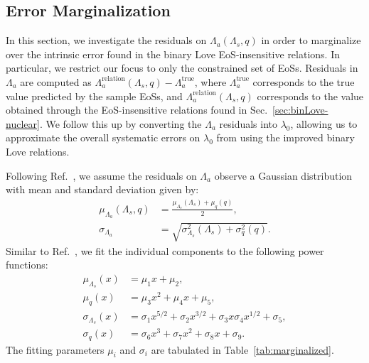 \documentclass[prd,twocolumn,nofootinbib,superscriptaddress,amsmath,amssymb]{revtex4-1}
\begin{document}
\subsection{Error Marginalization}\label{sec:marginalization}

In this section, we investigate the residuals on $\Lambda_a(\Lambda_s,q)$ in order to marginalize over the intrinsic error found in the binary Love EoS-insensitive relations.
In particular, we restrict our focus to only the constrained set of EoSs.
Residuals in $\Lambda_a$ are computed as $\Lambda_a^{\text{relation}}(\Lambda_s,q)-\Lambda_a^{\text{true}}$, where $\Lambda_a^{\text{true}}$ corresponds to the true value predicted by the sample EoSs, and $\Lambda_a^{\text{relation}}(\Lambda_s,q)$ corresponds to the value obtained through the EoS-insensitive relations found in Sec.~\ref{sec:binLove-nuclear}.
We follow this up by converting the $\Lambda_a$ residuals into $\lambda_0$, allowing us to approximate the overall systematic errors on $\lambda_0$ from using the improved binary Love relations.

Following Ref.~\cite{Katerina:residuals}, we assume the residuals on $\Lambda_a$ observe a Gaussian distribution with mean and standard deviation given by:
\begin{align}
\mu_{\Lambda_a}(\Lambda_s,q) &=\frac{\mu_{\Lambda_s}(\Lambda_s)+\mu_{q}(q)}{2},\\ 
\sigma_{\Lambda_a} &=\sqrt{\sigma_{\Lambda_s}^2(\Lambda_s) + \sigma_{q}^2(q)}. 
\end{align}
Similar to Ref.~\cite{Katerina:residuals}, we fit the individual components to the following power functions:
\begin{align}
\mu_{\Lambda_s}(x) &= \mu_1 x + \mu_2, \label{eq:margFit1}\\ 
\mu_{q}(x) &= \mu_3 x^2 + \mu_4 x + \mu_5, \label{eq:margFit2}\\ 
\sigma_{\Lambda_s}(x) &= \sigma_1 x^{5/2} + \sigma_2 x^{3/2} + \sigma_3 x \sigma_4 x^{1/2} + \sigma_5, \label{eq:margFit3}\\ 
\sigma_{q}(x) &= \sigma_6 x^3 + \sigma_7 x^2 + \sigma_8 x + \sigma_9. \label{eq:margFit4}
\end{align}
The fitting parameters $\mu_i$ and $\sigma_i$ are tabulated in Table~\ref{tab:marginalized}.
\end{document}
